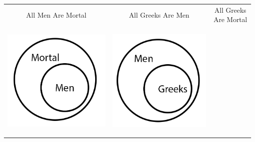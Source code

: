 \documentclass[12pt,a4paper]{report}
\begin{document}
\begin{table}[htb]
  \centering
  \begin{tabular}{ c  c  c }
    All Men Are Mortal & All Greeks Are Men & All Greeks Are Mortal\\
    \begin{minipage}{.29\textwidth}
        \begin{center}
             \includegraphics[scale=0.25]{EulerAllMenAreMortal}
         \end{center}
    \end{minipage}
    &
    \begin{minipage}{.29\textwidth}
         \begin{center}
              \includegraphics[scale=0.25]{EulerAllGreeksAreMen}

\end{center}
\end{minipage}
\end{tabular}
\end{table}
\end{document}
